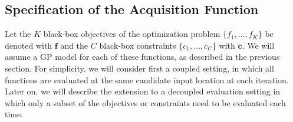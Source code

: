 \documentclass[review,preprint,12pt]{elsarticle}
\begin{document}
\subsection{Specification of the Acquisition Function}
\label{sec:gp_pred}

Let the $K$ black-box objectives of the optimization problem $\{f_1,\ldots,f_K\}$ be denoted 
with $\mathbf{f}$ and the $C$ black-box constraints $\{c_1,\ldots,c_C\}$ with $\mathbf{c}$.
We will assume a GP model for each of these functions, as described in the previous section. 
For simplicity, we will consider first 
a coupled setting, in which all functions are evaluated at the same candidate input location at each 
iteration. Later on, we will describe the extension to a decoupled evaluation setting in which
only a subset of the objectives or constraints need to be evaluated each time.
\end{document}
